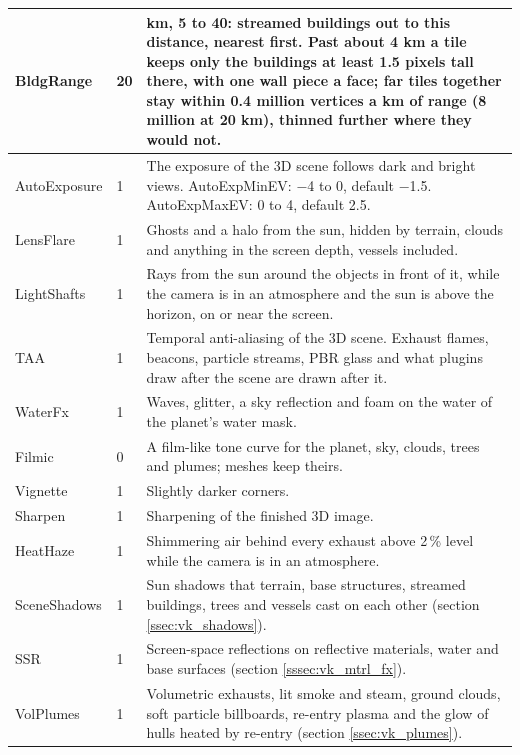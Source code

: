 \documentclass[Orbiter Developer Manual.tex]{subfiles}
\begin{document}
\begin{sloppypar}
\begin{longtable}{ |p{}|p{}|p{}| }
	\hline\rule{0pt}{2ex}
	BldgRange & 20 & km, 5 to 40: streamed buildings out to this distance, nearest first. Past about 4 km a tile keeps only the buildings at least 1.5 pixels tall there, with one wall piece a face; far tiles together stay within 0.4 million vertices a km of range (8 million at 20 km), thinned further where they would not.\\
	\hline\rule{0pt}{2ex}
	AutoExposure & 1 & The exposure of the 3D scene follows dark and bright views. AutoExpMinEV: $-$4 to 0, default $-$1.5. AutoExpMaxEV: 0 to 4, default 2.5.\\
	\hline\rule{0pt}{2ex}
	LensFlare & 1 & Ghosts and a halo from the sun, hidden by terrain, clouds and anything in the screen depth, vessels included.\\
	\hline\rule{0pt}{2ex}
	LightShafts & 1 & Rays from the sun around the objects in front of it, while the camera is in an atmosphere and the sun is above the horizon, on or near the screen.\\
	\hline\rule{0pt}{2ex}
	TAA & 1 & Temporal anti-aliasing of the 3D scene. Exhaust flames, beacons, particle streams, PBR glass and what plugins draw after the scene are drawn after it.\\
	\hline\rule{0pt}{2ex}
	WaterFx & 1 & Waves, glitter, a sky reflection and foam on the water of the planet's water mask.\\
	\hline\rule{0pt}{2ex}
	Filmic & 0 & A film-like tone curve for the planet, sky, clouds, trees and plumes; meshes keep theirs.\\
	\hline\rule{0pt}{2ex}
	Vignette & 1 & Slightly darker corners.\\
	\hline\rule{0pt}{2ex}
	Sharpen & 1 & Sharpening of the finished 3D image.\\
	\hline\rule{0pt}{2ex}
	HeatHaze & 1 & Shimmering air behind every exhaust above 2\,\% level while the camera is in an atmosphere.\\
	\hline\rule{0pt}{2ex}
	SceneShadows & 1 & Sun shadows that terrain, base structures, streamed buildings, trees and vessels cast on each other (section \ref{ssec:vk_shadows}).\\
	\hline\rule{0pt}{2ex}
	SSR & 1 & Screen-space reflections on reflective materials, water and base surfaces (section \ref{sssec:vk_mtrl_fx}).\\
	\hline\rule{0pt}{2ex}
	VolPlumes & 1 & Volumetric exhausts, lit smoke and steam, ground clouds, soft particle billboards, re-entry plasma and the glow of hulls heated by re-entry (section \ref{ssec:vk_plumes}).\\

\end{longtable}
\end{sloppypar}
\end{document}
